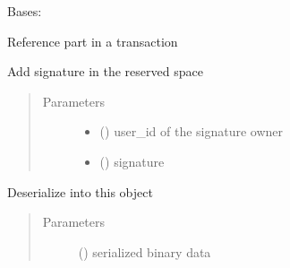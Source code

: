 \documentclass[letterpaper,10pt,english]{sphinxmanual}
\begin{document}
\begin{fulllineitems}
\label{\detokenize{bbc1.core.bbclib:bbc1.core.bbclib.BBcReference}}
Bases: 

Reference part in a transaction

\begin{fulllineitems}
\label{\detokenize{bbc1.core.bbclib:bbc1.core.bbclib.BBcReference.add_signature}}
Add signature in the reserved space
\begin{quote}\begin{description}
\item[{Parameters}] \leavevmode\begin{itemize}
\item {} 
 () \textendash{} user\_id of the signature owner

\item {} 
 ({\hyperref[\detokenize{bbc1.core.bbclib:bbc1.core.bbclib.BBcSignature}]{}}) \textendash{} signature

\end{itemize}

\end{description}\end{quote}

\end{fulllineitems}


\begin{fulllineitems}
\label{\detokenize{bbc1.core.bbclib:bbc1.core.bbclib.BBcReference.deserialize}}
Deserialize into this object
\begin{quote}\begin{description}
\item[{Parameters}] \leavevmode
{} () \textendash{} serialized binary data


\end{description}
\end{quote}
\end{fulllineitems}
\end{fulllineitems}
\end{document}
